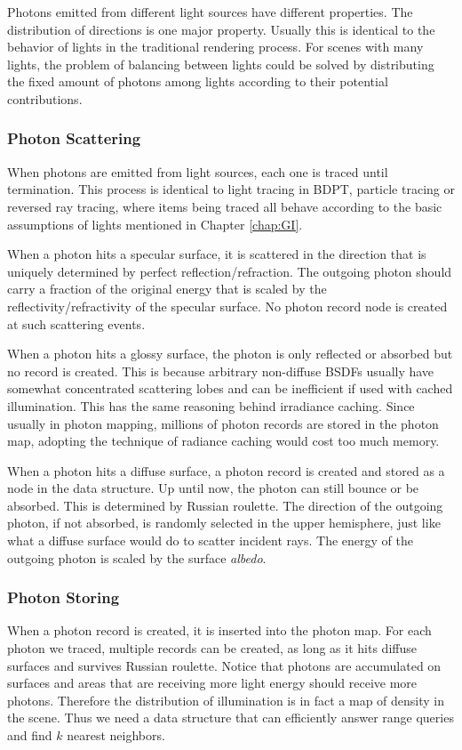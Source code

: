 \documentclass[]{book}
\begin{document}
Photons emitted from different light sources have different properties.
The distribution of directions is one major property.
Usually this is identical to the behavior of lights in the traditional rendering process.
For scenes with many lights, the problem of balancing between lights could be solved by distributing the fixed amount of photons among lights according to their potential contributions.

\subsubsection*{Photon Scattering}
When photons are emitted from light sources, each one is traced until termination.
This process is identical to light tracing in BDPT, particle tracing or reversed ray tracing, where items being traced all behave according to the basic assumptions of lights mentioned in Chapter \ref{chap:GI}.

When a photon hits a specular surface, it is scattered in the direction that is uniquely determined by perfect reflection/refraction.
The outgoing photon should carry a fraction of the original energy that is scaled by the reflectivity/refractivity of the specular surface.
No photon record node is created at such scattering events.

When a photon hits a glossy surface, the photon is only reflected or absorbed but no record is created.
This is because arbitrary non-diffuse BSDFs usually have somewhat concentrated scattering lobes and can be inefficient if used with cached illumination.
This has the same reasoning behind irradiance caching.
Since usually in photon mapping, millions of photon records are stored in the photon map, adopting the technique of radiance caching would cost too much memory.

When a photon hits a diffuse surface, a photon record is created and stored as a node in the data structure.
Up until now, the photon can still bounce or be absorbed.
This is determined by Russian roulette.
The direction of the outgoing photon, if not absorbed, is randomly selected in the upper hemisphere, just like what a diffuse surface would do to scatter incident rays.
The energy of the outgoing photon is scaled by the surface \textit{albedo}.

\subsubsection*{Photon Storing}
When a photon record is created, it is inserted into the photon map.
For each photon we traced, multiple records can be created, as long as it hits diffuse surfaces and survives Russian roulette.
Notice that photons are accumulated on surfaces and areas that are receiving more light energy should receive more photons.
Therefore the distribution of illumination is in fact a map of density in the scene.
Thus we need a data structure that can efficiently answer range queries and find $k$ nearest neighbors.
\end{document}
